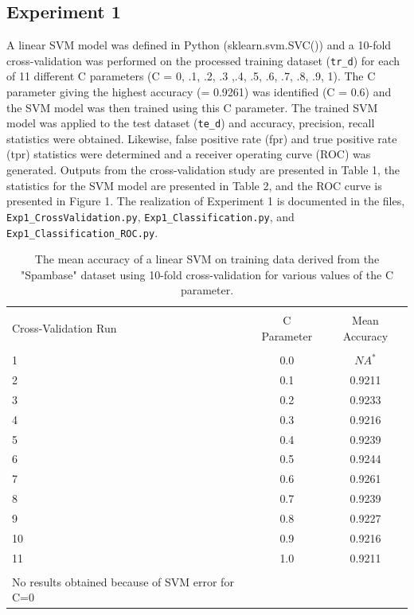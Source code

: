 \documentclass[12pt]{article}
\begin{document}
\subsection{Experiment 1}
A linear SVM model was defined in Python (sklearn.svm.SVC()) and a 10-fold cross-validation was performed on the processed training dataset (\verb|tr_d|) for each of 11 different C parameters ({C = 0, .1, .2, .3 ,.4, .5, .6, .7, .8, .9, 1}). The C parameter giving the highest accuracy (= 0.9261) was identified (C = 0.6) and the SVM model was then trained using this C parameter. The trained SVM model was applied to the test dataset (\verb|te_d|) and accuracy, precision, recall statistics were obtained. Likewise, false positive rate (fpr) and true positive rate (tpr) statistics were determined and a receiver operating curve (ROC) was generated. Outputs from the cross-validation study are presented in Table 1, the statistics for the SVM model are presented in Table 2, and the ROC curve is presented in Figure 1. The realization of Experiment 1 is documented in the files, \verb|Exp1_CrossValidation.py|, \verb|Exp1_Classification.py|, and \verb|Exp1_Classification_ROC.py|.
\begin{table}[!htbp] \centering 
  \caption{The mean accuracy of a linear SVM on training data derived from the "Spambase" dataset using 10-fold cross-validation for various values of the C parameter.} 
  \label{} 
\begin{tabular}{lcc} 
\\[-1.8ex]\hline 
\hline \\[-1.8ex] 
 Cross-Validation Run & {C Parameter} & {Mean Accuracy} \\
\hline \\[-1.8ex]
1 & 0.0 & $NA^{*}$\\
2 & 0.1 &  0.9211\\
3 & 0.2 & 0.9233\\
4 & 0.3 & 0.9216\\
5 & 0.4 & 0.9239\\
6 & 0.5 & 0.9244 \\
7 & 0.6 & 0.9261\\
8 & 0.7 & 0.9239\\
9 & 0.8 & 0.9227\\
10 & 0.9 & 0.9216\\
11 & 1.0 & 0.9211\\
\hline \\[-1.8ex]
\footnotesize * No results obtained because of SVM error for C=0
\end{tabular}
\end{table}
\end{document}
